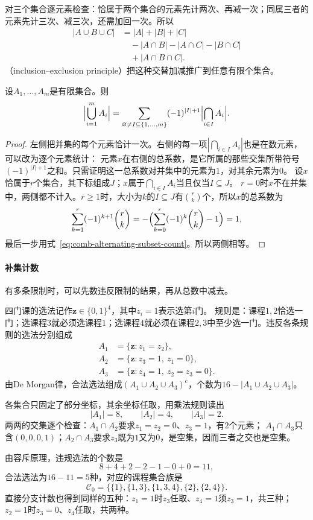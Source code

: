 对三个集合逐元素检查：恰属于两个集合的元素先计两次、再减一次；同属三者的元素先计三次、减三次，还需加回一次。所以
\[
 \begin{aligned}
  |A\cup B\cup C|&=|A|+|B|+|C|\\
  &\quad-|A\cap B|-|A\cap C|-|B\cap C|\\
  &\quad+|A\cap B\cap C|.
 \end{aligned}
\]
（inclusion--exclusion principle）把这种交替加减推广到任意有限个集合。
\begin{theorem}[有限容斥原理]
\label{thm:comb-inclusion-exclusion}
设$A_1,\ldots,A_m$是有限集合。则
\begin{equation}
  \Bigl|\bigcup_{i=1}^{m}A_i\Bigr|
  =\sum_{\varnothing\neq I\subseteq\{1,\ldots,m\}}(-1)^{|I|+1}\Bigl|\bigcap_{i\in I}A_i\Bigr|.
  \label{eq:comb-inclusion-exclusion}
\end{equation}
\end{theorem}
\begin{proof}
左侧把并集的每个元素恰计一次。右侧的每一项$|\bigcap_{i\in I}A_i|$也是在数元素，可以改为逐个元素统计：
元素$x$在右侧的总系数，是它所属的那些交集所带符号$(-1)^{|I|+1}$之和。只需证明这一总系数对并集中的元素为$1$，对其余元素为$0$。
设$x$恰属于$r$个集合，其下标组成$J$；$x$属于$\bigcap_{i\in I}A_i$当且仅当$I\subseteq J$。
$r=0$时$x$不在并集中，两侧都不计入。$r\geq1$时，大小为$k$的$I\subseteq J$有$\binom rk$个，所以$x$的总系数为
\[
 \sum_{k=1}^r(-1)^{k+1}\binom rk=-\Bigl(\sum_{k=0}^r(-1)^k\binom rk-1\Bigr)=1,
\]
最后一步用式~\eqref{eq:comb-alternating-subset-count}。所以两侧相等。
\end{proof}

\paragraph{补集计数}
有多条限制时，可以先数违反限制的结果，再从总数中减去。
\begin{example}[带限制的选课方案]
\label{ex:comb-constrained-course-selection}
四门课的选法记作$\bm z\in\{0,1\}^4$，其中$z_i=1$表示选第$i$门。
规则是：课程$1,2$恰选一门；选课程$3$就必须选课程$1$；选课程$4$就必须在课程$2,3$中至少选一门。违反各条规则的选法分别组成
\[
 \begin{aligned}
 A_1&=\{\bm z:z_1=z_2\},\\
 A_2&=\{\bm z:z_3=1,\ z_1=0\},\\
 A_3&=\{\bm z:z_4=1,\ z_2=z_3=0\}.
 \end{aligned}
\]
由De Morgan律，合法选法组成$(A_1\cup A_2\cup A_3)^{\mathrm c}$，个数为$16-|A_1\cup A_2\cup A_3|$。

各集合只固定了部分坐标，其余坐标任取，用乘法规则读出
\[
 |A_1|=8,\qquad |A_2|=4,\qquad |A_3|=2.
\]
两两的交集逐个检查：$A_1\cap A_2$要求$z_1=z_2=0$、$z_3=1$，有$2$个元素；
$A_1\cap A_3$只含$(0,0,0,1)$；$A_2\cap A_3$要求$z_3$既为$1$又为$0$，是空集，因而三者之交也是空集。

由容斥原理，违规选法的个数是
\[
 8+4+2-2-1-0+0=11,
\]
合法选法为$16-11=5$种，对应的课程集合族是
\[
 \mathcal C_0=\bigl\{\{1\},\{1,3\},\{1,3,4\},\{2\},\{2,4\}\bigr\}.
\]
直接分支计数也得到同样的五种：$z_1=1$时$z_3$任取、$z_4=1$须$z_3=1$，共三种；$z_2=1$时$z_3=0$、$z_4$任取，共两种。
\end{example}

